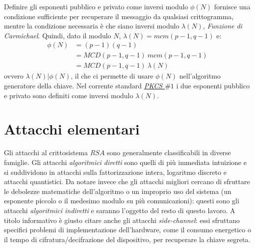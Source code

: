 \documentclass[twoside,symmetric,justified,openany,nobib]{tufte-book}
\begin{document}
Definire gli esponenti pubblico e privato come inversi modulo $\phi(N)$ fornisce una condizione sufficiente per recuperare il messaggio da qualsiasi crittogramma, mentre la condizione necessaria è che siano inversi modulo $\lambda(N)$, \textit{Funzione di Carmichael}. Quindi, dato il modulo $N$, $\lambda(N){=}mcm(p{-}1,q{-}1)$ e:
\[
  \begin{split}
    \phi(N) &= (p{-}1)(q{-}1)\\
    &=MCD(p{-}1,q{-}1)\ mcm(p{-}1,q{-}1)\\
    &=MCD(p{-}1,q{-}1)\ \lambda(N)
  \end{split}
\]
ovvero $\lambda(N)|\phi(N)$, il che ci permette di usare $\phi(N)$ nell'algoritmo generatore della chiave. Nel corrente standard \hyperlink{pkcs1}{\textit{PKCS $\#1$}} i due esponenti pubblico e privato sono definiti come inversi modulo $\lambda(N)$.



\section*{\normalfont\textbf{Attacchi elementari}}\label{sec:elementary-attack}
Gli attacchi al crittosistema $RSA$ sono generalmente classificabili in diverse famiglie. Gli attacchi \textit{algoritmici diretti} sono quelli di più immediata intuizione e si suddividono in attacchi sulla fattorizzazione intera, logaritmo discreto e attacchi quantistici. Da notare invece che gli attacchi migliori cercano di sfruttare le debolezze matematiche dell'algoritmo o un improprio uso del sistema (un esponente piccolo o il medesimo modulo su più comunicazioni): questi sono gli attacchi \textit{algoritmici indiretti} e saranno l'oggetto del resto di questo lavoro.
A titolo informativo è giusto citare anche gli attacchi \textit{side-channel}: essi sfruttano specifici problemi di implementazione dell'hardware, come il consumo energetico o il tempo di cifratura/decifrazione del dispositivo, per recuperare la chiave segreta.
\end{document}
